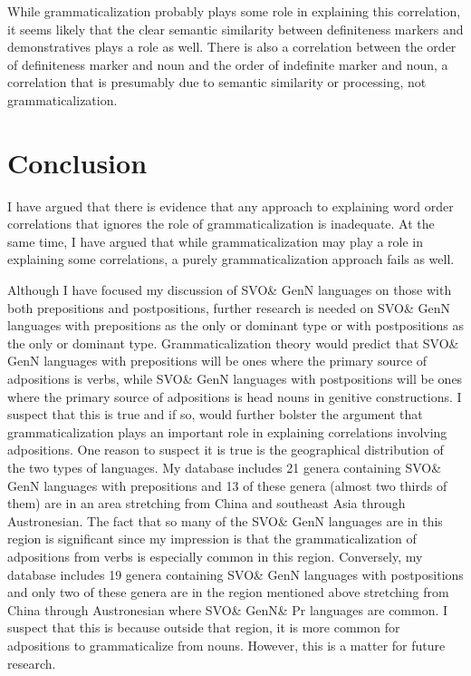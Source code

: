 \documentclass[output=paper]{langsci/langscibook}
\begin{document}
While grammaticalization probably plays some role in explaining this correlation, it seems likely that the clear semantic similarity between definiteness markers and demonstratives plays a role as well. There is also a correlation between the order of definiteness marker and noun and the order of indefinite marker and noun, a correlation that is presumably due to semantic similarity or processing, not grammaticalization.

\section{Conclusion}

I have argued that there is evidence that any approach to explaining word order correlations that ignores the role of grammaticalization is inadequate. At the same time, I have argued that while grammaticalization may play a role in explaining some correlations, a purely grammaticalization approach fails as well.

Although I have focused my discussion of SVO\& GenN languages on those with both prepositions and postpositions, further research is needed on SVO\& GenN languages with prepositions as the only or dominant type or with postpositions as the only or dominant type. Grammaticalization theory would predict that SVO\& GenN languages with prepositions will be ones where the primary source of adpositions is verbs, while SVO\& GenN languages with postpositions will be ones where the primary source of adpositions is head nouns in genitive constructions. I suspect that this is true and if so, would further bolster the argument that grammaticalization plays an important role in explaining correlations involving adpositions. One reason to suspect it is true is the geographical distribution of the two types of languages. My database includes 21 genera containing SVO\& GenN languages with prepositions and 13 of these genera (almost two thirds of them) are in an area stretching from China and southeast Asia through Austronesian. The fact that so many of the SVO\& GenN languages are in this region is significant since my impression is that the grammaticalization of adpositions from verbs is especially common in this region. Conversely, my database includes 19 genera containing SVO\& GenN languages with postpositions and only two of these genera are in the region mentioned above stretching from China through Austronesian where SVO\& GenN\& Pr languages are common. I suspect that this is because outside that region, it is more common for adpositions to grammaticalize from nouns. However, this is a matter for future research.
\end{document}
